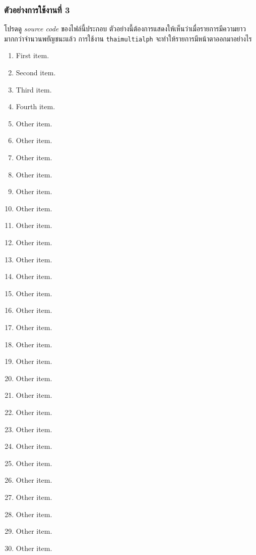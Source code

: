 \documentclass[10pt]{ltxguide}
\begin{document}
\subsubsection*{ตัวอย่างการใช้งานที่ 3}
โปรดดู \emph{source code} ของไฟล์นี้ประกอบ ตัวอย่างนี้ต้องการแสดงให้เห็นว่าเมื่อรายการมีความยาวมากกว่าจำนวนพยัญชนะแล้ว การใช้งาน \textlatin{\texttt{thaimultialph}} จะทำให้รายการมีหน้าตาออกมาอย่างไร

\begin{multicols}{4}
    \small
    \begin{enumerate}[topsep=0em,itemsep=0em,label={\thaimultialph*.}]
        \item  First item.
        \item  Second item.
        \item  Third item.
        \item  Fourth item.
        \item  Other item.
        \item  Other item.
        \item  Other item.
        \item  Other item.
        \item  Other item.
        \item  Other item.
        \item  Other item.
        \item  Other item.
        \item  Other item.
        \item  Other item.
        \item  Other item.
        \item  Other item.
        \item  Other item.
        \item  Other item.
        \item  Other item.
        \item  Other item.
        \item  Other item.
        \item  Other item.
        \item  Other item.
        \item  Other item.
        \item  Other item.
        \item  Other item.
        \item  Other item.
        \item  Other item.
        \item  Other item.
        \item  Other item.

\end{enumerate}
\end{multicols}
\end{document}
